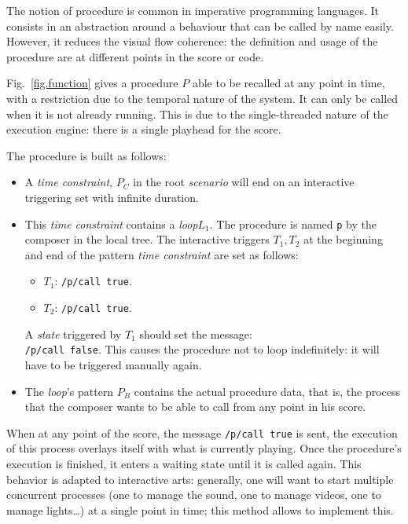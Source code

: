\documentclass{article}
\newcommand{\scenario}{\textit{scenario}\xspace}
\newcommand{\Loop}{\textit{loop}\xspace}
\newcommand{\state}{\textit{state}\xspace}
\newcommand{\timeconstraint}{\textit{time constraint}\xspace}
\begin{document}
The notion of procedure is common in imperative programming languages.
It consists in an abstraction around a behaviour that can be called 
by name easily.
However, it reduces the visual flow coherence: 
the definition and usage of the procedure are at 
different points in the score or code.

Fig.~\ref{fig.function} gives a 
procedure $P$ able to be recalled at any point in time, with a restriction due to the temporal nature of the system.
It can only be called when it is not already running. 
This is due to the single-threaded nature of the execution engine: there is 
a single playhead for the score.

The procedure is built as follows: 
\begin{itemize}
    \item A \timeconstraint, $P_C$ in the root \scenario will end on an interactive triggering set with infinite duration.
    \item This \timeconstraint contains a \Loop $L_1$. 
    The procedure is named \lstinline{p} by the composer in the local tree. 
    The interactive triggers $T_1, T_2$ at the beginning and end of the pattern \timeconstraint are set as follows: 
    \begin{itemize}
        \item $T_1$: \lstinline{/p/call true}.
        \item $T_2$: \lstinline{/p/call true}.
    \end{itemize}
    A \state triggered by $T_1$ should set the message:~\\
    \lstinline{/p/call false}. 
    This causes the procedure not to loop 
    indefinitely: it will have to be triggered manually again.
    \item The \Loop's pattern $P_B$ contains the actual procedure data, that is, the process that the composer wants to be able to call from any point in his score. 
\end{itemize}

When at any point of the score, the message \lstinline{/p/call true} is sent, the execution of this process overlays itself with what is currently playing.
Once the procedure's execution is finished, it enters a waiting state until it is called again.
This behavior is adapted to interactive arts: generally, one will want to start multiple 
concurrent processes (one to manage the sound, one to manage videos, one to manage lights\dots) at a single point in time; this method allows to implement this.
\end{document}
